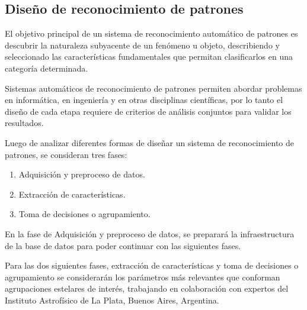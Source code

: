 	
	\subsection{Diseño de reconocimiento de patrones}
	
	El objetivo principal de un sistema de reconocimiento  automático  de  patrones  es  descubrir  la  naturaleza  subyacente  de  un  fenómeno u objeto, describiendo y seleccionado las características fundamentales que permitan  clasificarlos  en  una  categoría  determinada\cite{batagelj2006data}\cite{fukunaga2013introduction}.  
	
	Sistemas  automáticos  de  reconocimiento  de  patrones  permiten  abordar problemas  en  informática,  en  ingeniería  y en otras disciplinas científicas\cite{devijver2012pattern}\cite{meyer2004pattern}, por lo tanto  el  diseño  de  cada  etapa  requiere  de criterios de análisis conjuntos para validar  los  resultados\cite{kim2005robust}\cite{kim2005new}. 
	
	Luego de analizar diferentes formas de diseñar un sistema de reconocimiento de patrones, se consideran tres fases\cite{alonso2001redes}:
	
	\begin{enumerate}
		\item Adquisición y preproceso de datos.
		\item Extracción de características.
		\item Toma de decisiones o agrupamiento. 
	\end{enumerate}
	
	En la fase de Adquisición y preproceso de datos, se preparará la infraestructura de la base de datos para poder continuar con las siguientes fases.
	
	Para las dos siguientes fases, extracción de características y toma de decisiones o agrupamiento se considerarán los parámetros más relevantes que conforman agrupaciones estelares de interés, trabajando en colaboración con expertos del Instituto Astrofísico de La Plata, Buenos Aires, Argentina.
\fi